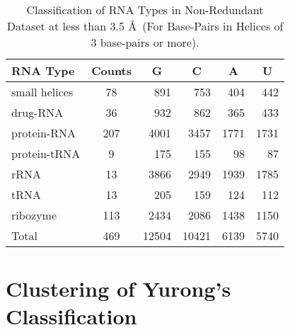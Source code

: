\begin{table}[htbp]
\begin{center}
\begin{tabular}{|l|c|r|r|r|r|}
\hline
RNA Type & \multicolumn{1}{l|}{Counts} & \multicolumn{1}{c|}{G} &
\multicolumn{1}{c|}{C} & \multicolumn{1}{c|}{A} &
\multicolumn{1}{c|}{U} \\ \hline \hline
small helices & 78 & 891 & 753 & 404 & 442 \\ \hline
drug-RNA & 36 & 932 & 862 & 365 & 433 \\ \hline
protein-RNA & 207 & 4001 & 3457 & 1771 & 1731 \\ \hline
protein-tRNA & 9 & 175 & 155 & 98 & 87 \\ \hline
rRNA & 13 & 3866 & 2949 & 1939 & 1785 \\ \hline
tRNA & 13 & 205 & 159 & 124 & 112 \\ \hline
ribozyme & 113 & 2434 & 2086 & 1438 & 1150 \\ \hline
Total & 469 & \multicolumn{1}{c|}{12504} & \multicolumn{1}{c|}{10421} & \multicolumn{1}{c|}{6139} & \multicolumn{1}{c|}{5740} \\ \hline
\end{tabular}
\caption{Classification of RNA Types in Non-Redundant Dataset at less
  than 3.5 \AA~(For Base-Pairs in Helices of 3 base-pairs or more).}
\label{dbase}
\end{center}
\end{table}




\section{Clustering of Yurong's Classification}



